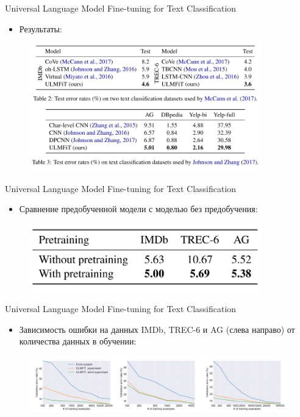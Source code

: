 \begin{frame}[c]{Universal Language Model Fine-tuning for Text Classification}
\begin{itemize}
	[square]
	\item Результаты:
\end{itemize}
\begin{figure}
	\centering
	\includegraphics[width=0.9\textwidth]{figures/ulmfitres.png}
\end{figure}
\end{frame}

\begin{frame}[c]{Universal Language Model Fine-tuning for Text Classification}
\begin{itemize}
	[square]
	\item Сравнение предобученной модели с моделью без предобучения:
\end{itemize}
\begin{figure}
	\centering
	\includegraphics[width=0.9\textwidth]{figures/ulmfit2.png}
\end{figure}
\end{frame}

\begin{frame}[c]{Universal Language Model Fine-tuning for Text Classification}
\begin{itemize}
	[square]
	\item Зависимость ошибки на данных IMDb, TREC-6 и AG (слева направо) от количества данных в обучении:
\end{itemize}
\begin{figure}
	\centering
	\includegraphics[width=1.0\textwidth]{figures/ulmfitres3.png}
\end{figure}
\end{frame}
